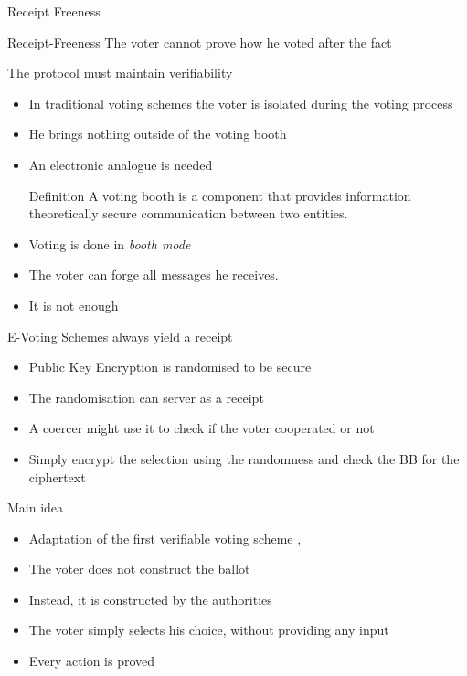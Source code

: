 \documentclass{beamer}
\begin{document}
\begin{frame}[allowframebreaks]{Receipt Freeness \cite{BT94}}
\begin{block}{Receipt-Freeness}
The voter cannot prove how he voted after the fact

The protocol must maintain verifiability
\end{block}

\begin{itemize}
\item In traditional voting schemes the voter is isolated during the voting process
\item He brings nothing outside of the voting booth
\item An electronic analogue is needed
\begin{block}{Definition}
A voting booth is a component that provides information theoretically secure communication between two entities. 
\end{block}
\item Voting is done in \textit{booth mode}
\item The voter can forge all messages he receives.
\item It is not enough
\end{itemize}

\begin{block}{E-Voting Schemes always yield a receipt}
\begin{itemize}
\item Public Key Encryption is randomised to be secure
\item The randomisation can server as a receipt
\item A coercer might use it to check if the voter cooperated or not
\item Simply encrypt the selection using the randomness and check the BB for the ciphertext
\end{itemize}
\end{block}

\framebreak

\begin{block}{Main idea}
\begin{itemize}
\item Adaptation of the first verifiable voting scheme \cite{CF85},\cite{CY86}
\item The voter does not construct the ballot
\item Instead, it is constructed by the authorities
\item The voter simply selects his choice, without providing any input
\item Every action is proved
\end{itemize}
\end{block}


\end{frame}
\end{document}
